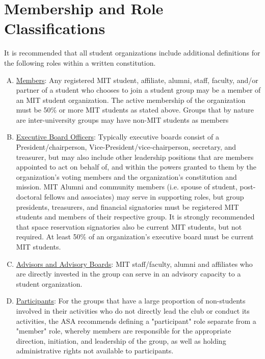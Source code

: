 \documentclass[12pt]{article}
\def\ul{\underline}
\begin{document}
\section{Membership and Role Classifications}
\label{art:I_sect3}
It is recommended that all student organizations include additional definitions for the following roles
within a written constitution.
\begin{enumerate}[A.]
    \item \ul{Members}: Any registered MIT student, affiliate, alumni, staff, faculty, and/or partner of a student
who chooses to join a student group may be a member of an MIT student organization. The
active membership of the organization must be 50\% or more MIT students as stated above.
Groups that by nature are inter-university groups may have non-MIT students as members

    \item \ul{Executive Board Officers}: Typically executive boards consist of a President/chairperson,
Vice-President/vice-chairperson, secretary, and treasurer, but may also include other
leadership positions that are members appointed to act on behalf of, and within the powers
granted to them by the organization’s voting members and the organization’s constitution and
mission. MIT Alumni and community members (i.e. spouse of student, post-doctoral fellows
and associates) may serve in supporting roles, but group presidents, treasurers, and financial
signatories must be registered MIT students and members of their respective group. It is
strongly recommended that space reservation signatories also be current MIT students, but
not required. At least 50\% of an organization’s executive board must be current MIT students.

    \item \ul{Advisors and Advisory Boards}: MIT staff/faculty, alumni and affiliates who are directly invested in
the group can serve in an advisory capacity to a student organization.

    \item \ul{Participants}: For the groups that have a large proportion of non-students involved in their
activities who do not directly lead the club or conduct its activities, the ASA recommends
defining a "participant" role separate from a "member" role, whereby members are responsible
for the appropriate direction, initiation, and leadership of the group, as well as holding
administrative rights not available to participants.
\end{enumerate}
\end{document}

